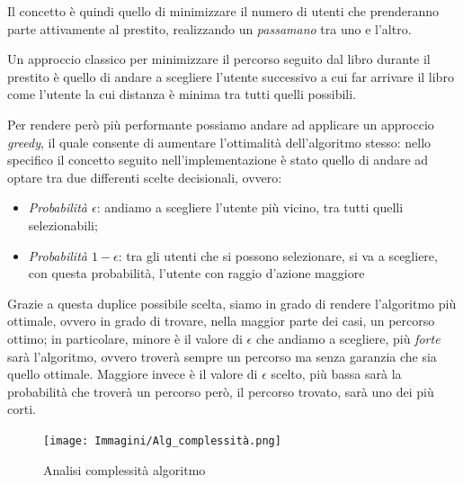 Il concetto è quindi quello di minimizzare il numero di utenti che prenderanno parte attivamente al prestito, realizzando un \textit{passamano} tra uno e l'altro.

Un approccio classico per minimizzare il percorso seguito dal libro durante il prestito è quello di andare a scegliere l'utente successivo a cui far arrivare il libro come l'utente la cui distanza è minima tra tutti quelli possibili.

Per rendere però più performante possiamo andare ad applicare un approccio \textit{greedy}, il quale consente di aumentare l'ottimalità dell'algoritmo stesso: nello specifico il concetto seguito nell'implementazione è stato quello di andare ad optare tra due differenti scelte decisionali, ovvero:
\begin{itemize}
	\item \textit{Probabilità $\epsilon$}: andiamo a scegliere l'utente più vicino, tra tutti quelli selezionabili;
	\item \textit{Probabilità $1 - \epsilon$}: tra gli utenti che si possono selezionare, si va a scegliere, con questa probabilità, l'utente con raggio d'azione maggiore
\end{itemize}

Grazie a questa duplice possibile scelta, siamo in grado di rendere l'algoritmo più ottimale, ovvero in grado di trovare, nella maggior parte dei casi, un percorso ottimo; in particolare, minore è il valore di $\epsilon$ che andiamo a scegliere, più \textit{forte} sarà l'algoritmo, ovvero troverà sempre un percorso ma senza garanzia che sia quello ottimale.
Maggiore invece è il valore di $\epsilon$ scelto, più bassa sarà la probabilità che troverà un percorso però, il percorso trovato, sarà uno dei più corti.

\begin{figure}[h!]
	\centering
	\texttt{[image: Immagini/Alg\_complessità.png]}
	\caption{Analisi complessità algoritmo}
	\label{fig:Alg_cmplx}
\end{figure}